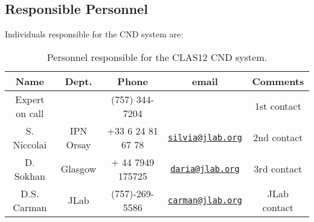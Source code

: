 \subsection{Responsible Personnel}

Individuals responsible for the CND system are:

\begin{table}[!htb]
\centering
\begin{tabular}{|c|c|c|c|c|} \hline
Name&Dept.&Phone&email&Comments \\ \hline
Expert on call& &(757) 344-7204 && 1st contact \\ \hline
S. Niccolai& IPN Orsay&+33 6 24 81 67 78&\href{mailto:silvia@jlab.org}{\nolinkurl{silvia@jlab.org}}& 2nd contact \\ \hline
D. Sokhan & Glasgow & + 44 7949 175725 &\href{mailto:daria@jlab.org}{\nolinkurl{daria@jlab.org}} & 3rd contact  \\ \hline
D.S. Carman & JLab & (757)-269-5586 & \href{mailto:carman@jlab.org}{\nolinkurl{carman@jlab.org}} & JLab contact \\ \hline
\end{tabular}
\caption{Personnel responsible for the CLAS12 CND system.} 
\label{tb:cnd}
\end{table}

